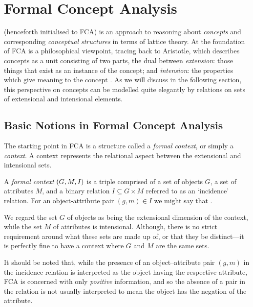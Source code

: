 \chapter{Formal Concept Analysis}
\label{chapter:formal-concept-analysis}

\FCA (henceforth initialised to FCA) is an approach to reasoning about \textit{concepts} and corresponding \textit{conceptual structures} in terms of lattice theory. At the foundation of FCA is a philosophical viewpoint, tracing back to Aristotle, which describes concepts as a unit consisting of two parts, the dual between \textit{extension}: those things that exist as an instance of the concept; and \textit{intension}: the properties which give meaning to the concept \cite[p. 1]{WILLE1992493} \cite[p. 414]{DUQUENNE1999407}. As we will discuss in the following section, this perspective on concepts can be modelled quite elegantly by relations on sets of extensional and intensional elements.  

\section{Basic Notions in Formal Concept Analysis}
\label{section:basic-notions}

The starting point in FCA is a structure called a \textit{formal context}, or simply a \textit{context}. A context represents the relational aspect between the extensional and intensional sets.
%
\begin{definition}
\label{definition:formal-context} 
  A \textit{formal context} $(G,M,\mathrel{I})$ is a triple comprised of a set of objects $G$, a set of attributes $M$, and a binary relation $I \subseteq G \times M$ referred to as an `incidence' relation. For an object-attribute pair $(g,m) \in I$ we might say that .
\end{definition}
%
We regard the set $G$ of objects as being the extensional dimension of the context, while the set $M$ of attributes is intensional. Although, there is no strict requirement around what these sets are made up of, or that they be distinct---it is perfectly fine to have a context where $G$ and $M$ are the same sets.

It should be noted that, while the presence of an object--attribute pair $(g,m)$ in the incidence relation is interpreted as the object having the respective attribute, FCA is concerned with only \textit{positive} information, and so the absence of a pair in the relation is not usually interpreted to mean the object has the negation of the attribute.

